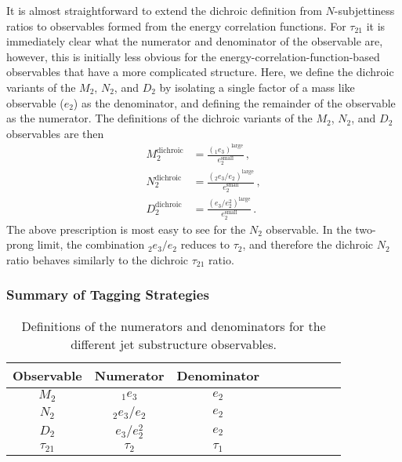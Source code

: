 It is almost straightforward to extend the dichroic definition from $N$-subjettiness ratios to observables formed from the energy correlation functions.
%
For $\tau_{21}$ it is immediately clear what the numerator and denominator of the observable are, however, this is initially less obvious for the energy-correlation-function-based observables that have a more complicated structure.
%
Here, we define the dichroic variants of the $M_2$, $N_2$, and $D_2$ by isolating a single factor of a mass like observable ($e_2$) as the denominator, and defining the remainder of the observable as the numerator.
%
The definitions of the dichroic variants of the $M_2$, $N_2$, and $D_2$
observables are then
\begin{align}
  M_2^{\text{dichroic}}&= \frac{( _1e_{3})^{\text{large}}  }{e_{2}^{\text{small}}}\,, \\
 N_2^{\text{dichroic}}&= \frac{\left( _{2}e_{3} / e_{2} \right)^{\text{large}} }{e_{2}^{\text{small}}}\,,\\
  D_2^{\text{dichroic}}&=\frac{\left( e_{3} / e_{2}^2 \right)^{\text{large}}}{ e_{2}^{\text{small}}}\,.
\end{align}
%
The above prescription is most easy to see for the $N_2$ observable. In the two-prong limit, the combination $ _{2}e_{3} / e_{2} $ reduces to $\tau_2$, and therefore the dichroic $N_2$ ratio behaves similarly to the dichroic $\tau_{21}$ ratio.

\subsubsection{Summary of Tagging Strategies}\label{sec:SM_jetsub_2prong:dichroic_sum}

\begin{table}
\begin{center}
\begin{tabular}{| c | c | c |c |c|c|c |c|r| }
  \hline                       
  Observable &  Numerator & Denominator \\
  \hline
  $M_2$ &   $_{1}e_{3}$ & $ e_{2}$ \\
  $N_2$ &   $_{2}e_{3} / e_{2} $ & $ e_{2}$ \\
  $D_2$ &   $e_{3} / e_{2}^2 $ & $ e_{2}$ \\
  $\tau_{21}$ &   $\tau_2$ & $\tau_1$ \\
  \hline  
\end{tabular}
\end{center}
\caption{
Definitions of the numerators and denominators for the different jet substructure observables.
}
\label{tab:SM_jetsub_2prong:dn}
\end{table}

